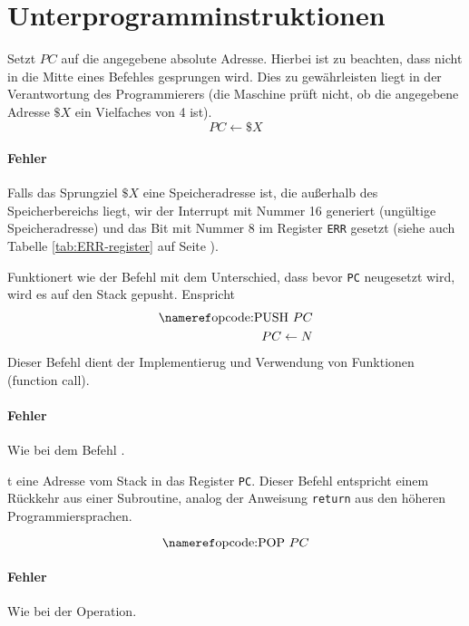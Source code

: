 \section{Unterprogramminstruktionen}

Setzt $PC$ auf die angegebene absolute Adresse. Hierbei ist zu beachten,  dass
nicht in die Mitte eines Befehles gesprungen wird. Dies zu gewährleisten liegt
in der Verantwortung des Programmierers (die Maschine prüft nicht, ob die
angegebene Adresse $\$X$ ein Vielfaches von 4 ist).
\[
    PC \gets \$X
\]

\paragraph{Fehler}
Falls das Sprungziel $\$X$ eine Speicheradresse ist, die außerhalb des
Speicherbereichs liegt, wir der Interrupt mit Nummer 16 generiert (ungültige
Speicheradresse) und das Bit mit Nummer 8 im Register \texttt{ERR} gesetzt
(siehe auch Tabelle \ref{tab:ERR-register} auf Seite
\pageref{tab:ERR-register}).


Funktionert wie der Befehl  mit dem Unterschied, dass bevor
\texttt{PC} neugesetzt wird, wird es auf den Stack gepusht. Enspricht
\begin{align*}
 \text{\opref{PUSH} } PC\\
 PC \gets N
\end{align*}
Dieser Befehl dient der Implementierug und Verwendung von Funktionen (function
call).

\paragraph{Fehler}
Wie bei dem Befehl .


t eine Adresse vom Stack in das Register \texttt{PC}. Dieser Befehl
entspricht einem Rückkehr aus einer Subroutine, analog der Anweisung
\texttt{return} aus den höheren Programmiersprachen.

\[
  \text{\opref{POP} } PC
\]

\paragraph{Fehler}
Wie bei der  Operation.



